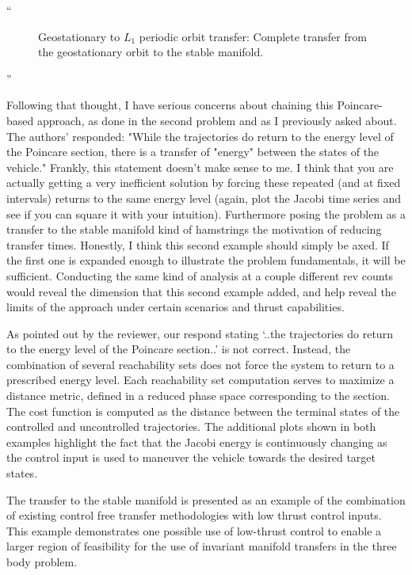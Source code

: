 \documentclass[11pt]{article}
\newenvironment{correction}{\begin{list}{}{\setlength{\leftmargin}{1cm}\setlength{\rightmargin}{1cm}}\vspace{\parsep}\item[]``}{''\end{list}}
\begin{document}
\begin{itemize}
\begin{correction}
\begin{figure}
        \caption{Geostationary to \( L_1 \) periodic orbit transfer: Complete transfer from the geostationary orbit to the stable manifold.\label{fig:geo_transfer}}
\end{figure}
        \end{correction}
    \item 
        \begin{itshape}
            Following that thought, I have serious concerns about chaining this Poincare-based approach, as done in the second problem and as I previously asked about.  The authors' responded: "While the trajectories do return to the energy level of the Poincare section, there is a transfer of "energy" between the states of the vehicle." Frankly, this statement doesn't make sense to me.  I think that you are actually getting a very inefficient solution by forcing these repeated (and at fixed intervals) returns to the same energy level (again, plot the Jacobi time series and see if you can square it with your intuition).  Furthermore posing the problem as a transfer to the stable manifold kind of hamstrings the motivation of reducing transfer times.  Honestly, I think this second example should simply be axed.  If the first one is expanded enough to illustrate the problem fundamentals, it will be sufficient.  Conducting the same kind of analysis at a couple different rev counts would
            reveal the dimension that this second example added, and help reveal the limits of the approach under certain scenarios and thrust capabilities.
        \end{itshape}

		As pointed out by the reviewer, our respond stating `..the trajectories do return to the energy level of the Poincare section..' is not correct. 
        Instead, the combination of several reachability sets does not force the system to return to a prescribed energy level.
        Each reachability set computation serves to maximize a distance metric, defined in a reduced phase space corresponding to the \Poincare section.
        The cost function is computed as the distance between the terminal states of the controlled and uncontrolled trajectories.
        The additional plots shown in both examples highlight the fact that the Jacobi energy is continuously changing as the control input is used to maneuver the vehicle towards the desired target states.

        The transfer to the stable manifold is presented as an example of the combination of existing control free  transfer methodologies with low thrust control inputs.
        This example demonstrates one possible use of low-thrust control to enable a larger region of feasibility for the use of invariant manifold transfers in the three body problem. 


\end{itemize}
\end{document}
